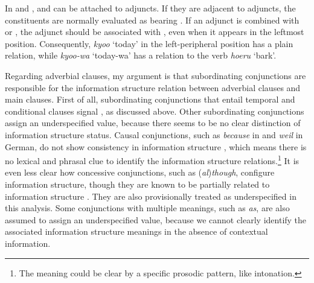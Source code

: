 In  and , \wa and \nun can be attached to
adjuncts. If they are adjacent to adjuncts, the constituents are
normally evaluated as bearing . If an adjunct is
combined with \wa or \nun, the adjunct should be associated with
, even when it appears in the leftmost
position. Consequently, \textit{kyoo} `today' in the left-peripheral
position has a plain  relation, while \textit{kyoo-wa}
`today-wa' has a  relation to the verb
\textit{hoeru} `bark'.







Regarding adverbial clauses, my argument is that
subordinating conjunctions are responsible for the information
structure relation between adverbial clauses and main
clauses. First of all, subordinating conjunctions
that entail temporal and conditional clauses signal 
\citep{haiman:78,ramsay:87}, as discussed above. Other subordinating
conjunctions assign an underspecified  value, because
there seems to be no clear distinction of information structure
status. Causal conjunctions, such as \textit{because} in  and
\textit{weil} in German, do not show consistency in information
structure \citep{heycock:07}, which means there is no lexical and
phrasal clue to identify the information structure
relations.\footnote{The meaning could be clear by a specific prosodic
  pattern, like intonation.}  It is even less clear how concessive
conjunctions, such as (\textit{al})\textit{though}, configure
information structure, though they are known to be partially related
to information structure \citep{chung:kim:09}.
They are also provisionally treated as underspecified in this analysis. Some
conjunctions with multiple meanings, such as \textit{as}, are also
assumed to assign an underspecified value, because we cannot 
clearly identify the associated information structure meanings in the
absence of contextual information.




